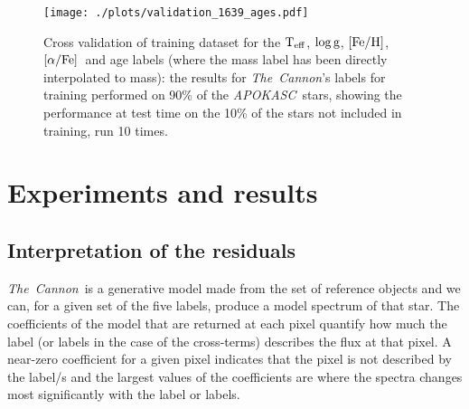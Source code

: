 \documentclass[12pt, preprint]{aastex}
\newcommand{\project}[1]{\textsl{#1}}
\newcommand{\tc}{\project{The~Cannon}}
\newcommand{\apokasc}{\project{APOKASC}}
\newcommand{\teff}{\mbox{$\rm T_{eff}$}}
\newcommand{\feh}{\mbox{$\rm [Fe/H]$}}
\newcommand{\alphafe}{\mbox{$\rm [\alpha/Fe]$}}
\newcommand{\logg}{\mbox{$\rm \log g$}}
\begin{document}
\begin{figure}[p!]
\centering
        \texttt{[image: ./plots/validation\_1639\_ages.pdf]}
  \caption{Cross validation of training dataset for the \teff, \logg, \feh, \alphafe\ and age labels (where the mass label has been directly interpolated to mass): the results for \tc's labels for training performed on 90\% of the \apokasc\ stars, showing the performance at test time on the 10\% of the stars not included in training, run 10 times.}
\label{fig:validation2}
\end{figure}




\section{Experiments and results}

\subsection{Interpretation of the residuals}

\tc\ is a generative model made from the set of reference objects and we can, for a given set of the five labels, produce a model spectrum of that star.  The coefficients of the model that are returned at each pixel quantify how much the label (or labels in the case of the cross-terms) describes the flux at that pixel. A near-zero coefficient for a given pixel indicates that the pixel is not described by the label/s and the largest values of the coefficients are where the spectra changes most significantly with the label or labels. 
\end{document}
